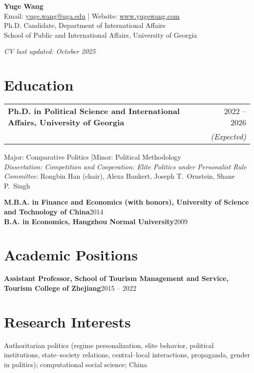 \documentclass[11pt]{article}
\makeatletter
\newcommand{\HEADBOT}{1.5em}
\newcommand{\entry}[2]{\noindent\textbf{#1}\hfill #2\\}
\newcommand{\entryexp}[3]{%
	\noindent
	\begin{tabular*}{\linewidth}{@{\extracolsep{\fill}} l r}
		\textbf{#1} & #2 \\
		& \emph{#3} \\
	\end{tabular*}\par
}
\makeatother
\begin{document}
	
	\begin{center}
		{\Huge \textbf{Yuge Wang}}\\[0.9em]
		Email: \href{mailto:yuge.wang@uga.edu}{yuge.wang@uga.edu} \quad | \quad
		Website: \href{https://www.yugewang.com}{www.yugewang.com}\\[0.6em]
		Ph.D. Candidate, Department of International Affairs\\
		School of Public and International Affairs, University of Georgia
		
		\vspace{1em}
		\emph{CV last updated: October 2025}
	\end{center}
	
	\vspace{\HEADBOT}
	
	\section*{Education}
	
	\entryexp
	{Ph.D. in Political Science and International Affairs, University of Georgia}
	{2022 -- 2026}
	{(Expected)}
	
	Major: Comparative Politics \quad|\quad Minor: Political Methodology\\[0.3em]
	\emph{Dissertation:} \textit{Competition and Cooperation: Elite Politics under Personalist Rule}\\[0.3em]
	\emph{Committee:} Rongbin Han (chair), Alexa Bankert, Joseph T.\ Ornstein, Shane P.\ Singh
	
	\entry{M.B.A. in Finance and Economics (with honors), University of Science and Technology of China}{2014}
	
	\entry{B.A. in Economics, Hangzhou Normal University}{2009}
	
	\section*{Academic Positions}
	\entry{Assistant Professor, School of Tourism Management and Service, Tourism College of Zhejiang}{2015 -- 2022}
	
	\section*{Research Interests}
	Authoritarian politics (regime personalization, elite behavior, political institutions, state--society relations, central--local interactions, propaganda, gender in politics); computational social science; China
	
\end{document}
